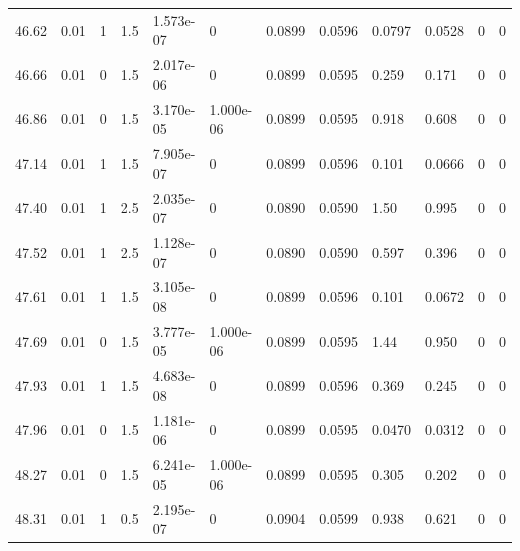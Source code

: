 \documentclass[preview]{standalone}
\begin{document}
{{{{{{{{{\begin{tabular}{L{1.2cm}C{1.2cm} C{0.3cm}C{0.5cm} C{1.4cm}C{1.4cm} C{1.4cm}C{1.4cm} C{1.6cm}C{1.6cm} C{1.6cm}C{1.6cm}}
  46.62  &  0.01  & 1     & 1.5 &  1.573e-07  & 0  &  0.0899&   0.0596& 0.0797 & 0.0528   &  0 & 0  \\ 
  46.66  &  0.01  & 0     & 1.5 &  2.017e-06  & 0  &  0.0899&   0.0595& 0.259 & 0.171   &  0 & 0  \\ 
  46.86  &  0.01  & 0     & 1.5 &  3.170e-05  & 1.000e-06  &  0.0899&   0.0595& 0.918 & 0.608   &  0 & 0  \\ 
  47.14  &  0.01  & 1     & 1.5 &  7.905e-07  & 0  &  0.0899&   0.0596& 0.101 & 0.0666   &  0 & 0  \\ 
  47.40  &  0.01  & 1     & 2.5 &  2.035e-07  & 0  &  0.0890&   0.0590& 1.50 & 0.995   &  0 & 0  \\ 
  47.52  &  0.01  & 1     & 2.5 &  1.128e-07  & 0  &  0.0890&   0.0590& 0.597 & 0.396   &  0 & 0  \\ 
  47.61  &  0.01  & 1     & 1.5 &  3.105e-08  & 0  &  0.0899&   0.0596& 0.101 & 0.0672   &  0 & 0  \\ 
  47.69  &  0.01  & 0     & 1.5 &  3.777e-05  & 1.000e-06  &  0.0899&   0.0595& 1.44 & 0.950   &  0 & 0  \\ 
  47.93  &  0.01  & 1     & 1.5 &  4.683e-08  & 0  &  0.0899&   0.0596& 0.369 & 0.245   &  0 & 0  \\ 
  47.96  &  0.01  & 0     & 1.5 &  1.181e-06  & 0  &  0.0899&   0.0595& 0.0470 & 0.0312   &  0 & 0  \\ 
  48.27  &  0.01  & 0     & 1.5 &  6.241e-05  & 1.000e-06  &  0.0899&   0.0595& 0.305 & 0.202   &  0 & 0  \\ 
  48.31  &  0.01  & 1     & 0.5 &  2.195e-07  & 0  &  0.0904&   0.0599& 0.938 & 0.621   &  0 & 0  \\ 
\hline 
\end{tabular} 

}}}}}}}}}
\end{document}
